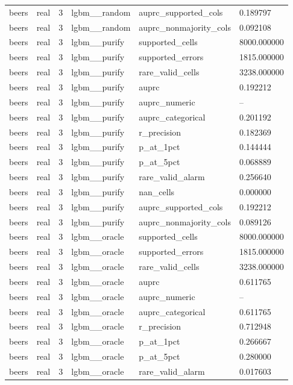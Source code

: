 \begin{tabular}{llllll}
beers & real & 3 & lgbm\_\_random & auprc\_supported\_cols & 0.189797 \\
beers & real & 3 & lgbm\_\_random & auprc\_nonmajority\_cols & 0.092108 \\
beers & real & 3 & lgbm\_\_purify & supported\_cells & 8000.000000 \\
beers & real & 3 & lgbm\_\_purify & supported\_errors & 1815.000000 \\
beers & real & 3 & lgbm\_\_purify & rare\_valid\_cells & 3238.000000 \\
beers & real & 3 & lgbm\_\_purify & auprc & 0.192212 \\
beers & real & 3 & lgbm\_\_purify & auprc\_numeric & -- \\
beers & real & 3 & lgbm\_\_purify & auprc\_categorical & 0.201192 \\
beers & real & 3 & lgbm\_\_purify & r\_precision & 0.182369 \\
beers & real & 3 & lgbm\_\_purify & p\_at\_1pct & 0.144444 \\
beers & real & 3 & lgbm\_\_purify & p\_at\_5pct & 0.068889 \\
beers & real & 3 & lgbm\_\_purify & rare\_valid\_alarm & 0.256640 \\
beers & real & 3 & lgbm\_\_purify & nan\_cells & 0.000000 \\
beers & real & 3 & lgbm\_\_purify & auprc\_supported\_cols & 0.192212 \\
beers & real & 3 & lgbm\_\_purify & auprc\_nonmajority\_cols & 0.089126 \\
beers & real & 3 & lgbm\_\_oracle & supported\_cells & 8000.000000 \\
beers & real & 3 & lgbm\_\_oracle & supported\_errors & 1815.000000 \\
beers & real & 3 & lgbm\_\_oracle & rare\_valid\_cells & 3238.000000 \\
beers & real & 3 & lgbm\_\_oracle & auprc & 0.611765 \\
beers & real & 3 & lgbm\_\_oracle & auprc\_numeric & -- \\
beers & real & 3 & lgbm\_\_oracle & auprc\_categorical & 0.611765 \\
beers & real & 3 & lgbm\_\_oracle & r\_precision & 0.712948 \\
beers & real & 3 & lgbm\_\_oracle & p\_at\_1pct & 0.266667 \\
beers & real & 3 & lgbm\_\_oracle & p\_at\_5pct & 0.280000 \\
beers & real & 3 & lgbm\_\_oracle & rare\_valid\_alarm & 0.017603 \\

\end{tabular}
